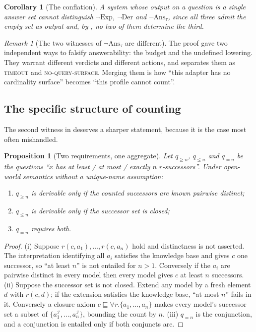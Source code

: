 \documentclass[11pt,a4paper]{article}
\theoremstyle{plain}
\newtheorem{proposition}[theorem]{Proposition}
\newtheorem{corollary}[theorem]{Corollary}
\theoremstyle{definition}
\theoremstyle{remark}
\newtheorem{remark}[theorem]{Remark}
\newcommand{\vsurf}{\textsc{no-query-surface}}
\newcommand{\vtime}{\textsc{timeout}}
\newcommand{\qq}{q}
\begin{document}
\begin{corollary}[The conflation]
\label{cor:conflation}
A system whose output on a question is a single answer set cannot distinguish
$\neg\mathrm{Exp}$, $\neg\mathrm{Der}$ and $\neg\mathrm{Ans}_\tau$, since all
three admit the empty set as output and, by , no two of
them determine the third.
\end{corollary}

\begin{remark}[The two witnesses of $\neg\mathrm{Ans}_\tau$ are different]
\label{rem:two-ans}
The proof gave two independent ways to falsify answerability: the budget and
the undefined lowering. They warrant different verdicts and different actions,
and  separates them as \vtime{} and \vsurf. Merging them is
how ``this adapter has no cardinality surface'' becomes ``this profile cannot
count''.
\end{remark}

\subsection{The specific structure of counting}

The second witness in  deserves a sharper statement,
because it is the case most often mishandled.

\begin{proposition}[Two requirements, one aggregate]
\label{prop:counting-split}
Let $\qq_{\geq n}$, $\qq_{\leq n}$ and $\qq_{=n}$ be the questions
``$x$ has at least / at most / exactly $n$ $r$-successors''. Under open-world
semantics without a unique-name assumption:
\begin{enumerate}[label=(\roman*)]
\item $\qq_{\geq n}$ is derivable only if the counted successors are known
      pairwise distinct;
\item $\qq_{\leq n}$ is derivable only if the successor set is closed;
\item $\qq_{=n}$ requires both.
\end{enumerate}
\end{proposition}

\begin{proof}
(i) Suppose $r(c, a_1), \dots, r(c, a_n)$ hold and distinctness is not
asserted. The interpretation identifying all $a_i$ satisfies the knowledge
base and gives $c$ one successor, so ``at least $n$'' is not entailed for
$n>1$. Conversely if the $a_i$ are pairwise distinct in every model then every
model gives $c$ at least $n$ successors. (ii) Suppose the successor set is not
closed. Extend any model by a fresh element $d$ with $r(c,d)$; if the extension
satisfies the knowledge base, ``at most $n$'' fails in it. Conversely a closure
axiom $c \sqsubseteq \forall r.\{a_1,\dots,a_n\}$ makes every model's successor
set a subset of $\{a_1^\mathcal{I},\dots,a_n^\mathcal{I}\}$, bounding the count
by $n$. (iii) $\qq_{=n}$ is the conjunction, and a conjunction is entailed only
if both conjuncts are.
\end{proof}
\end{document}
